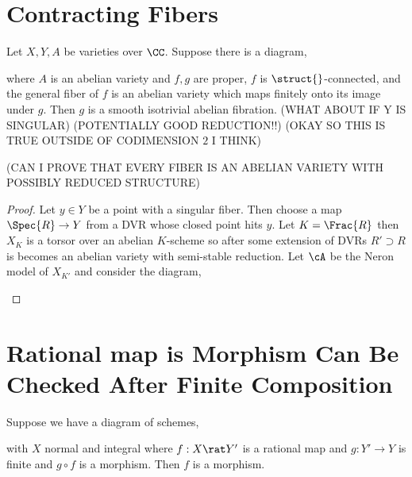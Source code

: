 \documentclass[12pt]{article}
\begin{document}
\section{Contracting Fibers}

\begin{prop}
Let $X, Y, A$ be varieties over $\CC$. Suppose there is a diagram,
\begin{center}
\end{center}
where $A$ is an abelian variety and $f,g$ are proper, $f$ is $\struct{}$-connected, and the general fiber of $f$ is an abelian variety which maps finitely onto its image under $g$. Then $g$ is a smooth isotrivial abelian fibration. (WHAT ABOUT IF Y IS SINGULAR) (POTENTIALLY GOOD REDUCTION!!) (OKAY SO THIS IS TRUE OUTSIDE OF CODIMENSION $2$ I THINK)
\end{prop}

(CAN I PROVE THAT EVERY FIBER IS AN ABELIAN VARIETY WITH POSSIBLY REDUCED STRUCTURE)

\begin{proof}
Let $y \in Y$ be a point with a singular fiber. Then choose a map $\Spec{R} \to Y$ from a DVR whose closed point hits $y$. Let $K = \Frac{R}$ then $X_K$ is a torsor over an abelian $K$-scheme so after some extension of DVRs $R' \supset R$ is becomes an abelian variety with semi-stable reduction. Let $\cA$ be the Neron model of $X_{K'}$ and consider the diagram,
\begin{center}
\end{center}
\end{proof}

\section{Rational map is Morphism Can Be Checked After Finite Composition}

\begin{lemma}
Suppose we have a diagram of schemes,
\begin{center}
\end{center}
with $X$ normal and integral where $f : X \rat Y'$ is a rational map and $g : Y' \to Y$ is finite and $g \circ f$ is a morphism. Then $f$ is a morphism.
\end{lemma}
\end{document}
